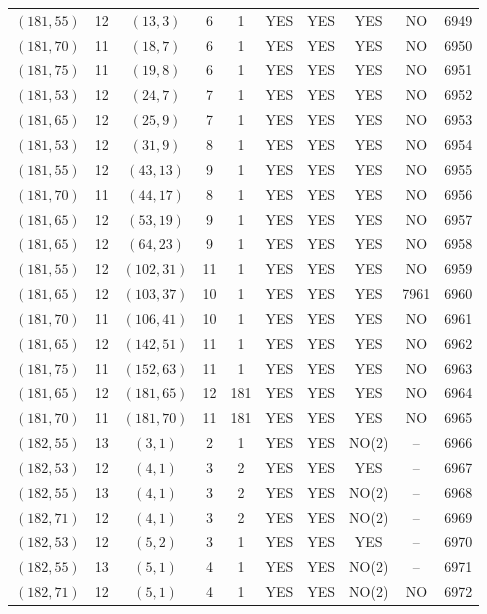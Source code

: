 \begin{longtable}{|c|c|c|c|c|c|c|c|c|c|}
$(181, 55)$ & 12 & $(13, 3)$ & 6 & 1 & YES & YES & YES & NO & 6949\\
$(181, 70)$ & 11 & $(18, 7)$ & 6 & 1 & YES & YES & YES & NO & 6950\\
$(181, 75)$ & 11 & $(19, 8)$ & 6 & 1 & YES & YES & YES & NO & 6951\\
$(181, 53)$ & 12 & $(24, 7)$ & 7 & 1 & YES & YES & YES & NO & 6952\\
$(181, 65)$ & 12 & $(25, 9)$ & 7 & 1 & YES & YES & YES & NO & 6953\\
$(181, 53)$ & 12 & $(31, 9)$ & 8 & 1 & YES & YES & YES & NO & 6954\\
$(181, 55)$ & 12 & $(43, 13)$ & 9 & 1 & YES & YES & YES & NO & 6955\\
$(181, 70)$ & 11 & $(44, 17)$ & 8 & 1 & YES & YES & YES & NO & 6956\\
$(181, 65)$ & 12 & $(53, 19)$ & 9 & 1 & YES & YES & YES & NO & 6957\\
$(181, 65)$ & 12 & $(64, 23)$ & 9 & 1 & YES & YES & YES & NO & 6958\\
$(181, 55)$ & 12 & $(102, 31)$ & 11 & 1 & YES & YES & YES & NO & 6959\\
$(181, 65)$ & 12 & $(103, 37)$ & 10 & 1 & YES & YES & YES & 7961 & 6960\\
$(181, 70)$ & 11 & $(106, 41)$ & 10 & 1 & YES & YES & YES & NO & 6961\\
$(181, 65)$ & 12 & $(142, 51)$ & 11 & 1 & YES & YES & YES & NO & 6962\\
$(181, 75)$ & 11 & $(152, 63)$ & 11 & 1 & YES & YES & YES & NO & 6963\\
$(181, 65)$ & 12 & $(181, 65)$ & 12 & 181 & YES & YES & YES & NO & 6964\\
$(181, 70)$ & 11 & $(181, 70)$ & 11 & 181 & YES & YES & YES & NO & 6965\\
$(182, 55)$ & 13 & $(3, 1)$ & 2 & 1 & YES & YES & NO(2) & -- & 6966\\
$(182, 53)$ & 12 & $(4, 1)$ & 3 & 2 & YES & YES & YES & -- & 6967\\
$(182, 55)$ & 13 & $(4, 1)$ & 3 & 2 & YES & YES & NO(2) & -- & 6968\\
$(182, 71)$ & 12 & $(4, 1)$ & 3 & 2 & YES & YES & NO(2) & -- & 6969\\
$(182, 53)$ & 12 & $(5, 2)$ & 3 & 1 & YES & YES & YES & -- & 6970\\
$(182, 55)$ & 13 & $(5, 1)$ & 4 & 1 & YES & YES & NO(2) & -- & 6971\\
$(182, 71)$ & 12 & $(5, 1)$ & 4 & 1 & YES & YES & NO(2) & NO & 6972\\

\end{longtable}

